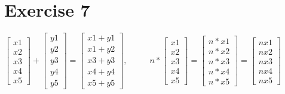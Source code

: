 \documentclass[a4paper]{article}
\begin{document}
\section*{Exercise 7}

$
\begin{bmatrix} 
x1\\x2\\x3\\x4\\x5
\end{bmatrix}
+
\begin{bmatrix} 
y1\\y2\\y3\\y4\\y5
\end{bmatrix}
=
\begin{bmatrix} 
x1+y1\\x1+y2\\x3+y3\\x4+y4\\x5+y5
\end{bmatrix}
,
\ \ \ \ \ \ \ \ \ \ \ \ 
n *
\begin{bmatrix} 
x1\\x2\\x3\\x4\\x5
\end{bmatrix}
=
\begin{bmatrix} 
n *x1\\n* x2\\n*x3\\n*x4\\n*x5
\end{bmatrix}
=
\begin{bmatrix} 
nx1\\nx2\\nx3\\nx4\\nx5
\end{bmatrix}
$
\end{document}

